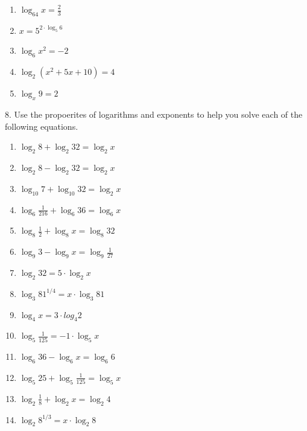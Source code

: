 \documentclass[10pt,]{book}
\theoremstyle{plain}
\theoremstyle{definition}
\theoremstyle{definition}
\theoremstyle{definition}
\numberwithin{equation}{section}
\begin{document}
\begin{exerciselist}
\begin{enumerate}[label=(\alph*)]
\item\hypertarget{li-207}{}\(\log_{64} x = \frac{2}{3}\)%
\item\hypertarget{li-208}{}\(x = 5^{2 \cdot \log_5 6}\)%
\item\hypertarget{li-209}{}\(\log_6 x^2 = -2\)%
\item\hypertarget{li-210}{}\(\log_2 \left(x^2 + 5x + 10 \right) = 4\)%
\item\hypertarget{li-211}{}\(\log_x 9 = 2\)%
\end{enumerate}
\par\smallskip
\item[8.]\hypertarget{exercise-82}{}\hypertarget{p-306}{}%
Use the propoerites of logarithms and exponents to help you solve each of the following equations.%
\leavevmode%
\begin{enumerate}[label=(\alph*)]
\item\hypertarget{li-212}{}\(\log_2 8 + \log_2 32 = \log_2 x\)%
\item\hypertarget{li-213}{}\(\log_2 8 - \log_2 32 = \log_2 x\)%
\item\hypertarget{li-214}{}\(\log_{10} 7 + \log_{10} 32 = \log_2 x\)%
\item\hypertarget{li-215}{}\(\log_6 \frac{1}{216} + \log_6 36 = \log_6 x\)%
\item\hypertarget{li-216}{}\(\log_8 \frac{1}{2} + \log_8 x = \log_8 32\)%
\item\hypertarget{li-217}{}\(\log_9 3 - \log_9 x = \log_9 \frac{1}{27}\)%
\item\hypertarget{li-218}{}\(\log_2 32 = 5 \cdot \log_2 x\)%
\item\hypertarget{li-219}{}\(\log_3 81^{1/4} = x \cdot \log_3 81\)%
\item\hypertarget{li-220}{}\(\log_4 x = 3 \cdot log_4 2\)%
\item\hypertarget{li-221}{}\(\log_5 \frac{1}{125} = -1 \cdot \log_5 x\)%
\item\hypertarget{li-222}{}\(\log_6 36 - \log_6 x = \log_6 6\)%
\item\hypertarget{li-223}{}\(\log_5 25 + \log_5 \frac{1}{125} = \log_5 x\)%
\item\hypertarget{li-224}{}\(\log_2 \frac{1}{8} + \log_2 x = \log_2 4\)%
\item\hypertarget{li-225}{}\(\log_2 8 ^ {1/3} = x \cdot \log_2 8\)%
\end{enumerate}
\par\smallskip
\end{exerciselist}
\typeout{************************************************}
\typeout{************************************************}
\end{document}

